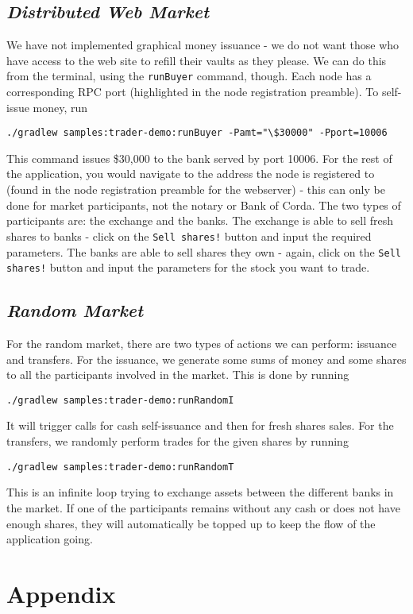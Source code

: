\documentclass[12pt,twoside]{article}
\begin{document}
\subsection*{\textit{Distributed Web Market}}
We have not implemented graphical money issuance - we do not want those who have access to the web site to refill their vaults as they please. We can do this from the terminal, using the \verb|runBuyer| command, though. Each node has a corresponding RPC port (highlighted in the node registration preamble). To self-issue money, run 
\begin{center}
\verb|./gradlew samples:trader-demo:runBuyer -Pamt="\$30000" -Pport=10006|
\end{center}
This command issues \$30,000 to the bank served by port 10006.
For the rest of the application, you would navigate to the address the node is registered to (found in the node registration preamble for the webserver) - this can only be done for market participants, not the notary or Bank of Corda. The two types of participants are: the exchange and the banks. The exchange is able to sell fresh shares to banks - click on the \verb|Sell shares!| button and input the required parameters. The banks are able to sell shares they own - again, click on the \verb|Sell shares!| button and input the parameters for the stock you want to trade.
\subsection*{\textit{Random Market}}
For the random market, there are two types of actions we can perform: issuance and transfers. For the issuance, we generate some sums of money and some shares to all the participants involved in the market. This is done by running
\begin{center}
\verb|./gradlew samples:trader-demo:runRandomI|
\end{center}
It will trigger calls for cash self-issuance and then for fresh shares sales. For the transfers, we randomly perform trades for the given shares by running 
\begin{center}
\verb|./gradlew samples:trader-demo:runRandomT|
\end{center}
This is an infinite loop trying to exchange assets between the different banks in the market. If one of the participants remains without any cash or does not have enough shares, they will automatically be topped up to keep the flow of the application going.
\newpage
\section*{Appendix} 
\end{document}
